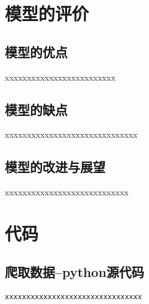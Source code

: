 \documentclass{whutmod}
\begin{document}
	\section{模型的评价}
	\subsection{模型的优点}
xxxxxxxxxxxxxxxxxxxxxxxxx
	
	\subsection{模型的缺点}
xxxxxxxxxxxxxxxxxxxxxxxxxxxxxx


	\subsection{模型的改进与展望}
xxxxxxxxxxxxxxxxxxxxxxxxxxxx
	\newpage	%
	
	\printbibliography[title = {参考文献}]	%
	
	\newpage
	\appendix %
\section{代码}
\subsection{爬取数据--python源代码}
\begin{lstlisting}[language=python]
xxxxxxxxxxxxxxxxxxxxxxxxxxxxxxxx
\end{lstlisting}
\end{document}
